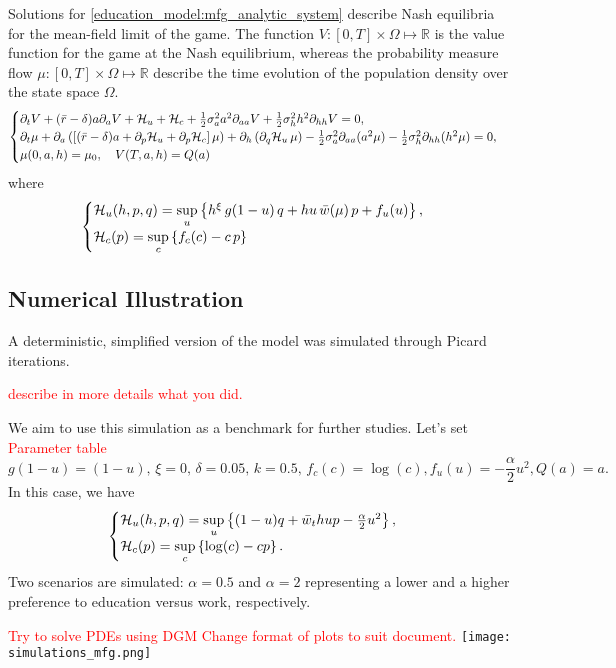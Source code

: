Solutions for \eqref{education_model:mfg_analytic_system} describe Nash equilibria for the mean-field limit of the game.
The function $V: [0,T] \times \Omega \mapsto \mathbb{R}$ is the value function for the game at the Nash equilibrium,
whereas the probability measure flow $\mu: [0,T] \times \Omega \mapsto \mathbb{R}$ describe the time evolution of the  population density over the state space $\Omega$.
\begin{equation}\label{education_model:mfg_analytic_system}
    \begin{cases}
        \partial_t V + (\bar r  - \delta) a \partial_a V + \mathcal{H}_u  + \mathcal{H}_c + \frac{1}{2} \sigma_a^2 a^2 \partial_{aa} V + \frac{1}{2} \sigma^2_h h^2 \partial_{hh} V = 0,\\
        \partial_t \mu + \partial_a \left( \left[ (\bar r - \delta) a + \partial_p \mathcal{H}_u + \partial_p \mathcal{H}_c \right] \mu \right)  + \partial_h \left( \partial_q \mathcal{H}_u\, \mu\right)  - \frac{1}{2} \sigma_a^2 \partial_{aa} (a^2\mu) - \frac{1}{2} \sigma^2_h \partial_{hh} (h^2\mu) = 0,\\
        \mu(0,a,h) = \mu_0,\quad V(T,a,h) = Q(a)
    \end{cases}
\end{equation}
where
\begin{equation}
    \begin{cases}
        \mathcal{H}_u(h,p,q) = \sup\limits_{u} \left \{ h^\xi \, g(1 - u)\, q + h u \, \bar w (\mu)\, p + f_u(u)\right\},\\
        \mathcal{H}_c(p) = \sup\limits_{c} \left \{  f_c(c) - c \, p \right \}
    \end{cases}
\end{equation}

\subsection{Numerical Illustration}
        A deterministic, simplified version of the model was simulated through Picard iterations.
        
        \textcolor{red}{describe in more details what you did.}
        
        We aim to use this simulation as a benchmark for further studies.        
        Let's set \textcolor{red}{Parameter table}
        $$g(1- u) = (1 - u),\,\xi = 0,\, \delta = 0.05, \, k = 0.5,\, f_c(c) = \log(c), f_u(u) = -\frac{\alpha}{2} u^2, Q(a) = a.$$        
        In this case, we have 
        \begin{equation}
            \begin{cases}    
            \mathcal{H}_u(h,p,q) = \sup\limits_{u} \left\{ (1 - u)q + \bar w_t h u p - \frac{\alpha}{2} u^2 \right\},\\
            \mathcal{H}_c (p) = \sup\limits_{c} \left\{ \log(c) - cp \right\}.
            \end{cases}
        \end{equation} 
        Two scenarios are simulated: $\alpha = 0.5$ and  $\alpha = 2$ representing a lower and a higher preference to education versus work, respectively.

        \textcolor{red}{Try to solve PDEs using DGM}
        \textcolor{red}{Change format of plots to suit document.}
        \texttt{[image: simulations\_mfg.png]}